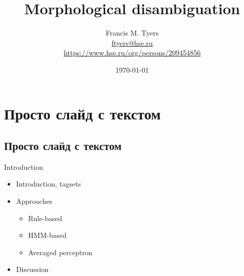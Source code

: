 \documentclass{beamer}
\title[Disambiguation]{Morphological disambiguation}
\author[Francis M. Tyers]{Francis M. Tyers\\ \smallskip \scriptsize \url{ftyers@hse.ru}\\\url{https://www.hse.ru/org/persons/209454856}}
\institute[Высшая школа экономики]{Национальный исследовательский университет \\ «Высшая школа экономики» (Москва)}
\date{\today}
\begin{document}

\frame[plain]{\titlepage}	%

\section{Просто слайд с текстом}
\subsection{Просто слайд с текстом}

\begin{frame}{Introduction}


\begin{itemize}
 \item Introduction, tagsets
 \item Approaches
 \begin{itemize}
    \item Rule-based
    \item HMM-based
    \item Averaged perceptron
 \end{itemize}
 \item Discussion
\end{itemize}

\end{frame}
\end{document}
